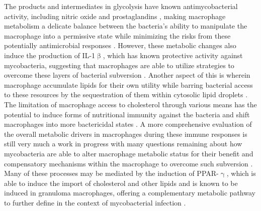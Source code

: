 The products and intermediates in glycolysis have known antimycobacterial activity, including nitric oxide and prostaglandins \citep{MacMicking1997b, MayerBarber2014}, making macrophage metabolism a delicate balance between the bacteria's ability to manipulate the macrophage into a permissive state while minimizing the risks from these potentially antimicrobial responses \citep{OsadaOka2019}. However, these metabolic changes also induce the production of IL\hyp{}1$\upbeta$, which has known protective activity against mycobacteria, suggesting that macrophages are able to utilize strategies to overcome these layers of bacterial subversion \citep{Juffermans2000, Fremond2007, Corcoran2016, Ogryzko2019, Shi2019}. Another aspect of this is wherein macrophage accumulate lipids for their own utility while barring bacterial access to these resources by the sequestration of them within cytosolic lipid droplets \citep{Knight2018, Laval2021}. The limitation of macrophage access to cholesterol through various means has the potential to induce forms of nutritional immunity against the bacteria and shift macrophages into more bactericidal states \citep{Pandey2008, Yang2014c, Babunovic2022}. A more comprehensive evaluation of the overall metabolic drivers in macrophages during these immune responses is still very much a work in progress with many questions remaining about how mycobacteria are able to alter macrophage metabolic status for their benefit and compensatory mechanisms within the macrophage to overcome such subversion \citep{Pagan2022}. Many of these processes may be mediated by the induction of PPAR\hyp{}$\upgamma$, which is able to induce the import of cholesterol and other lipids and is known to be induced in granuloma macrophages, offering a complementary metabolic pathway to further define in the context of mycobacterial infection \citep{Chawla2001}.


